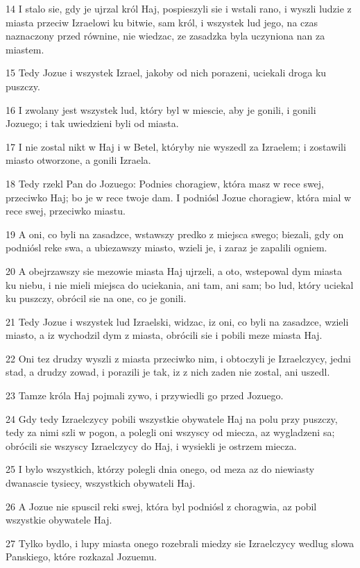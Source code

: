 \par 14 I stalo sie, gdy je ujrzal król Haj, pospieszyli sie i wstali rano, i wyszli ludzie z miasta przeciw Izraelowi ku bitwie, sam król, i wszystek lud jego, na czas naznaczony przed równine, nie wiedzac, ze zasadzka byla uczyniona nan za miastem.
\par 15 Tedy Jozue i wszystek Izrael, jakoby od nich porazeni, uciekali droga ku puszczy.
\par 16 I zwolany jest wszystek lud, który byl w miescie, aby je gonili, i gonili Jozuego; i tak uwiedzieni byli od miasta.
\par 17 I nie zostal nikt w Haj i w Betel, któryby nie wyszedl za Izraelem; i zostawili miasto otworzone, a gonili Izraela.
\par 18 Tedy rzekl Pan do Jozuego: Podnies choragiew, która masz w rece swej, przeciwko Haj; bo je w rece twoje dam. I podniósl Jozue choragiew, która mial w rece swej, przeciwko miastu.
\par 19 A oni, co byli na zasadzce, wstawszy predko z miejsca swego; biezali, gdy on podniósl reke swa, a ubiezawszy miasto, wzieli je, i zaraz je zapalili ogniem.
\par 20 A obejrzawszy sie mezowie miasta Haj ujrzeli, a oto, wstepowal dym miasta ku niebu, i nie mieli miejsca do uciekania, ani tam, ani sam; bo lud, który uciekal ku puszczy, obrócil sie na one, co je gonili.
\par 21 Tedy Jozue i wszystek lud Izraelski, widzac, iz oni, co byli na zasadzce, wzieli miasto, a iz wychodzil dym z miasta, obrócili sie i pobili meze miasta Haj.
\par 22 Oni tez drudzy wyszli z miasta przeciwko nim, i obtoczyli je Izraelczycy, jedni stad, a drudzy zowad, i porazili je tak, iz z nich zaden nie zostal, ani uszedl.
\par 23 Tamze króla Haj pojmali zywo, i przywiedli go przed Jozuego.
\par 24 Gdy tedy Izraelczycy pobili wszystkie obywatele Haj na polu przy puszczy, tedy za nimi szli w pogon, a polegli oni wszyscy od miecza, az wygladzeni sa; obrócili sie wszyscy Izraelczycy do Haj, i wysiekli je ostrzem miecza.
\par 25 I bylo wszystkich, którzy polegli dnia onego, od meza az do niewiasty dwanascie tysiecy, wszystkich obywateli Haj.
\par 26 A Jozue nie spuscil reki swej, która byl podniósl z choragwia, az pobil wszystkie obywatele Haj.
\par 27 Tylko bydlo, i lupy miasta onego rozebrali miedzy sie Izraelczycy wedlug slowa Panskiego, które rozkazal Jozuemu.
